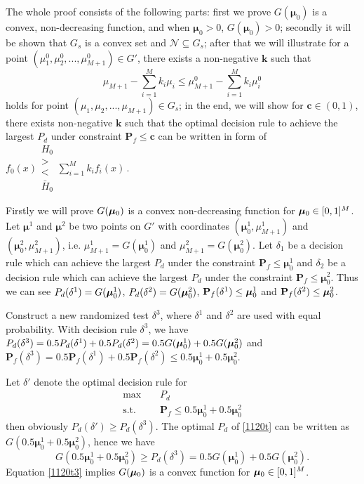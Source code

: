 The whole proof consists of the following parts: first we prove $G(\boldsymbol{\mu}_0)$ is a convex, non-decreasing function, and when $\boldsymbol{\mu}_0 > 0$, $G(\boldsymbol{\mu}_0) > 0$;
secondly it will be shown that $G_s$ is a convex set and $\mathcal{N} \subseteq G_s$; 
after that we will illustrate for a point $(\mu_1^0, \mu_2^0, ..., \mu_{M+1}^0) \in G'$, there exists a non-negative $\mathbf{k}$ such that 
\[
\mu_{M+1} - \sum_{i=1}^{M}k_i\mu_i \leq \mu_{M+1}^0 - \sum_{i=1}^{M}k_i\mu_i^0
\]
holds for point $(\mu_1, \mu_2, ..., \mu_{M+1}) \in G_s$;
in the end, we will show for $\mathbf{c} \in (0, 1)$, there exists non-negative $\mathbf{k}$ such that the optimal decision rule to achieve the largest $P_d$ under constraint $\mathbf{P}_f \leq \mathbf{c}$ can be written in form of 
$
f_0(x) \substack{H_0 \\ > \\ < \\ \bar{H}_0} \sum_{i=1}^{M}k_if_i(x)\,.
$

Firstly we will prove $G(\boldsymbol{\mu}_0)$ is a convex non-decreasing function for $\boldsymbol{\mu}_0 \in [0, 1]^M$.
Let $\boldsymbol{\mu}^1$ and  $\boldsymbol{\mu}^2$ be two points on $G'$ with coordinates $(\boldsymbol{\mu}^1_0, \mu_{M+1}^1)$ and $(\boldsymbol{\mu}^2_0, \mu_{M+1}^2)$, i.e. $\mu_{M+1}^1 = G(\boldsymbol{\mu}_0^1)$ and $\mu_{M+1}^2 = G(\boldsymbol{\mu}_0^2)$. Let $\delta_1$ be a decision rule which can achieve the largest $P_d$ under the constraint $\mathbf{P}_f \leq \boldsymbol{\mu}_0^1$ and $\delta_2$ be a decision rule which can achieve the largest $P_d$ under the constraint $\mathbf{P}_{f} \leq \boldsymbol{\mu}_0^2$. Thus we can see $P_d(\delta^1) = G(\boldsymbol{\mu}_0^1)$, $P_d(\delta^2) = G(\boldsymbol{\mu}_0^2)$, $\mathbf{P}_f(\delta^1) \leq \boldsymbol{\mu}_0^1$ and  $\mathbf{P}_f(\delta^2) \leq \boldsymbol{\mu}_0^2$.
 
Construct a new randomized test $\delta^3$, where $\delta^1$ and $\delta^2$ are used with equal probability. With decision rule $\delta^3$, we have 
$P_d(\delta^3) = 0.5P_d(\delta^1)+0.5P_d(\delta^2) = 0.5G(\boldsymbol{\mu}_0^1) + 0.5G(\boldsymbol{\mu}_0^2)$ and 
$\mathbf{P}_{f}(\delta^3) = 0.5\mathbf{P}_f(\delta^1)+0.5\mathbf{P}_f(\delta^2) \leq 0.5\boldsymbol{\mu}^1_0 + 0.5\boldsymbol{\mu}^2_0$.

Let $\delta'$ denote the optimal decision rule for 
 \begin{equation}
 \begin{split}
 \label{1120t}
 \max&\;\;\;\;P_d\\
 \text{s.t.}&\;\;\;\;\mathbf{P}_f \leq 0.5\boldsymbol{\mu}^1_0 + 0.5\boldsymbol{\mu}^2_0
 \end{split}
 \end{equation}
then obviously $P_d(\delta') \geq P_d(\delta^3)$. The optimal $P_d$ of \eqref{1120t} can be written as $G(0.5\boldsymbol{\mu}^1_0 + 0.5\boldsymbol{\mu}^2_0)$, hence we have  
\begin{equation}
\label{1120t3}
G(0.5\boldsymbol{\mu}^1_0 + 0.5\boldsymbol{\mu}^2_0) \geq  P_d(\delta^3) = 0.5 G(\boldsymbol{\mu}^1_0)+ 0.5 G(\boldsymbol{\mu}^2_0).
\end{equation}
Equation \eqref{1120t3} implies $G(\boldsymbol{\mu}_0)$ is a convex function for $\boldsymbol{\mu}_0 \in [0, 1]^M$.

